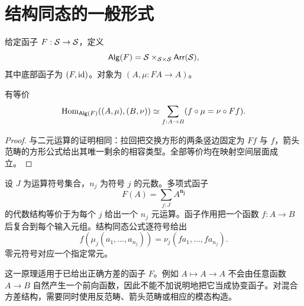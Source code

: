 \section{结构同态的一般形式}
\begin{definition}[函子代数]
给定函子 $F:\mathcal S\to\mathcal S$，定义
\[
\mathsf{Alg}(F)=
\mathcal S\times_{\mathcal S\times\mathcal S}\mathsf{Arr}(\mathcal S),
\]
其中底部函子为 $(F,\operatorname{id})$。对象为 $(A,\mu:FA\to A)$。
\end{definition}
\begin{theorem}[结构同态公式]
有等价
\[
\operatorname{Hom}_{\mathsf{Alg}(F)}((A,\mu),(B,\nu))
\simeq
\sum_{f:A\to B}(f\circ\mu=\nu\circ Ff).
\]
\end{theorem}
\begin{proof}
与二元运算的证明相同：拉回把交换方形的两条竖边固定为 $Ff$ 与 $f$，箭头范畴的方形公式给出其唯一剩余的相容类型。全部等价均在映射空间层面成立。
\end{proof}
\begin{example}[有限运算符号]
设 $J$ 为运算符号集合，$n_j$ 为符号 $j$ 的元数。多项式函子
\[
F(A)=\sum_{j:J}A^{\mathbf{n_j}}
\]
的代数结构等价于为每个 $j$ 给出一个 $n_j$ 元运算。函子作用把一个函数 $f:A\to B$ 后复合到每个输入元组。结构同态公式逐符号给出
\[
f(\mu_j(a_1,\ldots,a_{n_j}))
=\nu_j(fa_1,\ldots,fa_{n_j}).
\]
零元符号对应一个指定常元。
\end{example}
\begin{remark}
这一原理适用于已给出正确方差的函子 $F$。例如 $A\mapsto A\to A$ 不会由任意函数 $A\to B$ 自然产生一个前向函数，因此不能不加说明地把它当成协变函子。对混合方差结构，需要同时使用反范畴、箭头范畴或相应的模态构造。
\end{remark}

